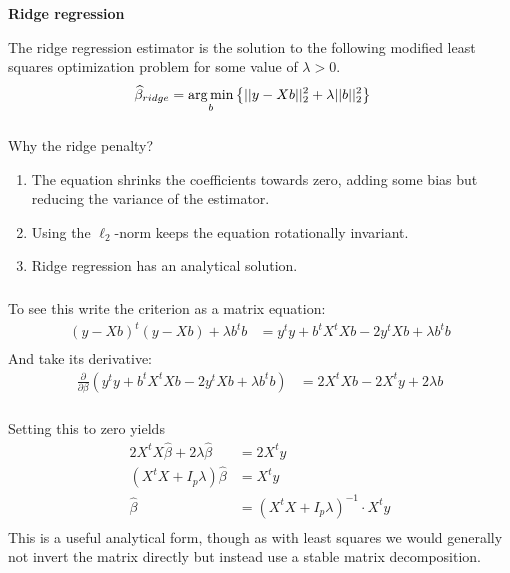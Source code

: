 \begin{frame}[fragile] \frametitle{}

\textbf{Ridge regression}

The ridge regression estimator is the solution to the following
modified least squares optimization problem for some value of $\lambda > 0$.
\begin{align*}
\widehat{\beta}_{ridge} &= \mathop{\mathrm{arg\,min}}_b \left\{ || y - Xb ||_2^2 + \lambda || b ||_2^2 \right\}
\end{align*}

\end{frame}

\begin{frame}[fragile] \frametitle{}

Why the ridge penalty?
\begin{enumerate}
\item The equation shrinks the coefficients towards zero, adding some bias but
reducing the variance of the estimator. \pause
\item Using the $\ell_2$-norm keeps the equation rotationally invariant. \pause
\item Ridge regression has an analytical solution.
\end{enumerate}

\end{frame}

\begin{frame}[fragile] \frametitle{}

To see this write the criterion as a matrix equation:
\begin{align*}
(y - Xb)^t (y - Xb)  + \lambda b^t b
&= y^t y + b^t X^t X b - 2 y^t X b + \lambda b^t b \\
\end{align*}
\pause And take its derivative:
\begin{align*}
\frac{\partial}{\partial \beta} \left( y^t y + b^t X^t X b - 2 y^t X b + \lambda b^t b \right)
&= 2 X^t X b - 2 X^t y + 2 \lambda b
\end{align*}

\end{frame}

\begin{frame}[fragile] \frametitle{}

Setting this to zero yields
\begin{align*}
2 X^t X \widehat{\beta} + 2 \lambda \widehat{\beta} &= 2 X^t y \\
(X^t X + I_p \lambda) \widehat{\beta} &=  X^t y \\
\widehat{\beta} &= (X^t X + I_p \lambda)^{-1} \cdot X^t y \\
\end{align*}
\pause This is a useful analytical form, though as with least
squares we would generally not invert the matrix directly but
instead use a stable matrix decomposition.

\end{frame}

